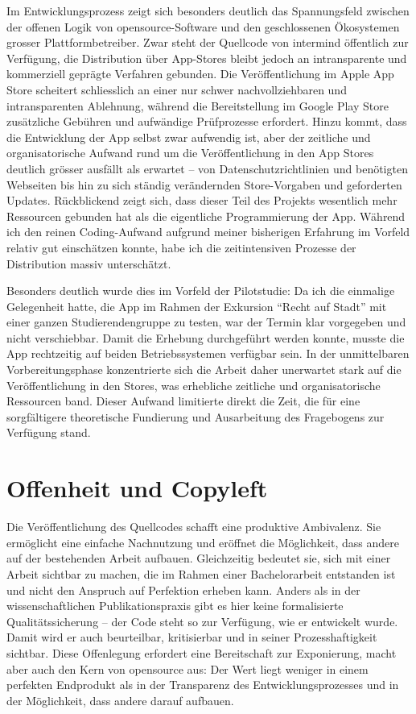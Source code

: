 \vspace{1em}

Im Entwicklungsprozess zeigt sich besonders deutlich das Spannungsfeld zwischen der offenen Logik von \gls{opensource}-Software und den geschlossenen Ökosystemen grosser Plattformbetreiber. Zwar steht der Quellcode von \gls{intermind} öffentlich zur Verfügung, die Distribution über App-Stores bleibt jedoch an intransparente und kommerziell geprägte Verfahren gebunden. Die Veröffentlichung im Apple App Store scheitert schliesslich an einer nur schwer nachvollziehbaren und intransparenten Ablehnung, während die Bereitstellung im Google Play Store zusätzliche Gebühren und aufwändige Prüfprozesse erfordert. Hinzu kommt, dass die Entwicklung der App selbst zwar aufwendig ist, aber der zeitliche und organisatorische Aufwand rund um die Veröffentlichung in den App Stores deutlich grösser ausfällt als erwartet – von Datenschutzrichtlinien und benötigten Webseiten bis hin zu sich ständig verändernden Store-Vorgaben und geforderten Updates. Rückblickend zeigt sich, dass dieser Teil des Projekts wesentlich mehr Ressourcen gebunden hat als die eigentliche Programmierung der App. Während ich den reinen Coding-Aufwand aufgrund meiner bisherigen Erfahrung im Vorfeld relativ gut einschätzen konnte, habe ich die zeitintensiven Prozesse der Distribution massiv unterschätzt.

Besonders deutlich wurde dies im Vorfeld der Pilotstudie: Da ich die einmalige Gelegenheit hatte, die App im Rahmen der Exkursion \enquote{Recht auf Stadt} mit einer ganzen Studierendengruppe zu testen, war der Termin klar vorgegeben und nicht verschiebbar. Damit die Erhebung durchgeführt werden konnte, musste die App rechtzeitig auf beiden Betriebssystemen verfügbar sein. In der unmittelbaren Vorbereitungsphase konzentrierte sich die Arbeit daher unerwartet stark auf die Veröffentlichung in den Stores, was erhebliche zeitliche und organisatorische Ressourcen band. Dieser Aufwand limitierte direkt die Zeit, die für eine sorgfältigere theoretische Fundierung und Ausarbeitung des Fragebogens zur Verfügung stand.

\section{Offenheit und Copyleft}

Die Veröffentlichung des Quellcodes schafft eine produktive Ambivalenz. Sie ermöglicht eine einfache Nachnutzung und eröffnet die Möglichkeit, dass andere auf der bestehenden Arbeit aufbauen. Gleichzeitig bedeutet sie, sich mit einer Arbeit sichtbar zu machen, die im Rahmen einer Bachelorarbeit entstanden ist und nicht den Anspruch auf Perfektion erheben kann. Anders als in der wissenschaftlichen Publikationspraxis gibt es hier keine formalisierte Qualitätssicherung -- der Code steht so zur Verfügung, wie er entwickelt wurde. Damit wird er auch beurteilbar, kritisierbar und in seiner Prozesshaftigkeit sichtbar. Diese Offenlegung erfordert eine Bereitschaft zur Exponierung, macht aber auch den Kern von \gls{opensource} aus: Der Wert liegt weniger in einem perfekten Endprodukt als in der Transparenz des Entwicklungsprozesses und in der Möglichkeit, dass andere darauf aufbauen.

